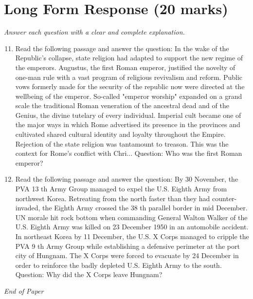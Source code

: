 \documentclass[12pt]{article}
\begin{document}
\section*{Long Form Response (20 marks)}
\textit{Answer each question with a clear and complete explanation.}
\begin{enumerate}[label=\arabic*.]
\setcounter{enumi}{10}
\item Read the following passage and answer the question: In the wake of the Republic's collapse, state religion had adapted to support the new regime of the emperors. Augustus, the first Roman emperor, justified the novelty of one-man rule with a vast program of religious revivalism and reform. Public vows formerly made for the security of the republic now were directed at the wellbeing of the emperor. So-called "emperor worship" expanded on a grand scale the traditional Roman veneration of the ancestral dead and of the Genius, the divine tutelary of every individual. Imperial cult became one of the major ways in which Rome advertised its presence in the provinces and cultivated shared cultural identity and loyalty throughout the Empire. Rejection of the state religion was tantamount to treason. This was the context for Rome's conflict with Chri... Question: Who was the first Roman emperor?
\item Read the following passage and answer the question: By 30 November, the PVA 13 th Army Group managed to expel the U.S. Eighth Army from northwest Korea. Retreating from the north faster than they had counter-invaded, the Eighth Army crossed the 38 th parallel border in mid December. UN morale hit rock bottom when commanding General Walton Walker of the U.S. Eighth Army was killed on 23 December 1950 in an automobile accident. In northeast Korea by 11 December, the U.S. X Corps managed to cripple the PVA 9 th Army Group while establishing a defensive perimeter at the port city of Hungnam. The X Corps were forced to evacuate by 24 December in order to reinforce the badly depleted U.S. Eighth Army to the south. Question: Why did the X Corps leave Hungnam?
\end{enumerate}

\vfill
\noindent\textit{End of Paper}
\end{document}
